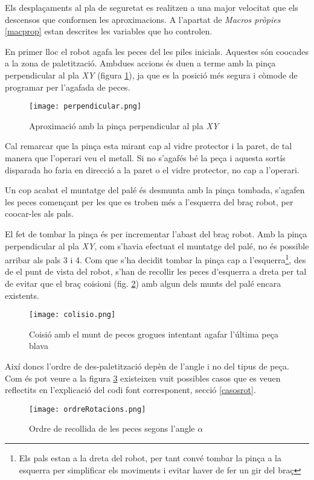 Els desplaçaments al pla de seguretat es realitzen a una major velocitat que els descensos
que conformen les aproximacions. A l'apartat de \emph{Macros pròpies} \ref{macprop}
estan descrites les variables que ho controlen.

En primer lloc el robot agafa les peces del les piles inicials.
Aquestes són co\lgem ocades a la zona de paletització. Ambdues
accions és duen a terme amb la pinça perpendicular al pla \emph{XY} (figura \ref{figperp}),
ja que es la posició més segura i còmode de programar per l'agafada
de peces.

\begin{figure}[H]
\begin{center}\label{figperp}
 \texttt{[image: perpendicular.png]}
\end{center}
  \caption{Aproximació amb la pinça perpendicular al pla \emph{XY}}
\end{figure}


Cal remarcar que la pinça esta mirant cap al vidre protector i la paret,
de tal manera que l'operari veu el metall.  Si no s'agafés bé la peça i
aquesta sortís disparada ho faria en direcció a la paret o el vidre protector,
no cap a l'operari.

Un cop acabat el muntatge del palé és desmunta amb la pinça tombada,
s'agafen les peces començant per les que es
troben més a l'esquerra del braç robot, per co\lgem ocar-les als pals.

El fet de tombar la pinça és per incrementar l'abast del braç robot. Amb la
pinça perpendicular al pla \emph{XY}, com s'havia efectuat el muntatge del palé, no
és possible arribar als pals 3 i 4. Com que s'ha decidit tombar la pinça
cap a l'esquerra\footnote{Els pals estan a la dreta del robot, per tant convé
tombar la pinça a la esquerra per simplificar els moviments i evitar haver
de fer un gir del braç}, des de el punt de vista del robot, s'han de recollir
les peces d'esquerra a dreta per tal de evitar que el braç co\lgem isioni
(fig. \ref{figcolisio}) amb algun dels munts del palé encara existents.

\begin{figure}[H]
\begin{center}\label{figcolisio}
 \texttt{[image: colisio.png]}
\end{center}
  \caption{Co\lgem isió amb el munt de peces grogues intentant agafar l'última peça blava}
\end{figure}

Així doncs l'ordre de des-paletització depèn de l'angle i no del tipus de peça.
Com és pot veure a la figura \ref{figrecpec} existeixen vuit possibles casos que es veuen
reflectits en l'explicació del codi font corresponent, secció \ref{casosrot}.

\begin{figure}[H]
\begin{center}\label{figrecpec}
 \texttt{[image: ordreRotacions.png]}
\end{center}
  \caption{Ordre de recollida de les peces segons l'angle $\alpha$}
\end{figure}

